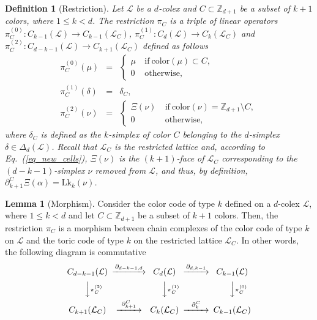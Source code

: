 \documentclass[onecolumn,letterpaper,11pt,accepted=2022-12-19]{quantumarticle}
\newcommand{\face}[2]{{\Delta_{#1}(#2)}}
\newcommand{\link}[2]{{\mathrm{Lk}_{#1}(#2)}}
\newcommand{\bnd}[2]{\partial_{#1,#2}}
\newcommand{\col}[1]{{\mathrm{color}(#1)}}
\newtheorem{definition}{Definition}
\theoremstyle{definition}
\newtheorem{lemma}{Lemma}
\theoremstyle{lemma}
\theoremstyle{theorem}
\theoremstyle{corollary}
\begin{document}
{\begin{definition}[Restriction]
Let $\mathcal{L}$ be a $d$-colex and $C\subset \mathbb{Z}_{d+1}$ be a subset of $k+1$ colors, where $1\leq k < d$.
The restriction $\pi_C$ is a triple of linear operators
$\pi^{(0)}_C : C_{k-1}({\mathcal L}) \rightarrow C_{k-1}({\mathcal L}_C)$,
${\pi^{(1)}_C : C_{d}({\mathcal L})\rightarrow C_{k}({\mathcal L}_C)}$ and
$\pi^{(2)}_C : C_{d-k-1}({\mathcal L}) \rightarrow C_{k+1}({\mathcal L}_C)$
defined as follows
\begin{eqnarray}
\pi^{(0)}_C(\mu) &=& 
\begin{cases}
\mu &\mathrm{\ if \ } \col{\mu} \subset C, \\
0 &\mathrm{\ otherwise},
\end{cases}\\
\pi^{(1)}_C(\delta) &=&  \delta_C,\\
\pi^{(2)}_C(\nu) &=& 
\begin{cases}
\Xi(\nu) &\mathrm{\ if \ } \col{\nu}= \mathbb{Z}_{d+1}\setminus C,\\
0 &\mathrm{\ otherwise},
\end{cases}
\end{eqnarray}
where $\delta_C$ is defined as the $k$-simplex of color $C$ belonging to the $d$-simplex $\delta\in\face{d}{\mathcal{L}}$.
Recall that $\mathcal{L}_C$ is the restricted lattice and, according to Eq.~(\ref{eq_new_cells}), $\Xi(\nu)$ is the $(k+1)$-face of ${\mathcal L}_C$ corresponding to the $(d-k-1)$-simplex $\nu$ removed from $\mathcal{L}$, and thus, by definition, $\partial_{k+1}^C \Xi(\alpha) = \link k \nu$.
\end{definition}



\begin{lemma}[Morphism]
\label{lemma_morphism}
Consider the color code of type $k$ defined on a $d$-colex $\mathcal{L}$, where $1\leq k < d$ and let $C \subset \mathbb{Z}_{d+1}$ be a subset of $k+1$ colors.
Then, the restriction $\pi_C$ is a morphism between chain complexes of the color code of type $k$ on $\mathcal{L}$ and the toric code of type $k$ on the restricted lattice $\mathcal{L}_C$.
In other words, the following diagram is commutative
\begin{equation}
\begin{CD}
C_{d-k-1}({\mathcal L}) @> \bnd{d-k-1}{d} >>
C_{d}({\mathcal L}) @> \bnd{d}{k-1} >>
C_{k-1}({\mathcal L})\\
@VV \pi^{(2)}_C V @VV \pi^{(1)}_C V @VV \pi^{(0)}_C V\\
C_{k+1}({\mathcal L}_C) @> \partial_{k+1}^C >> 
C_{k}({\mathcal L}_C) @> \partial_{k}^C >>
C_{k-1}({\mathcal L}_C)\\
\end{CD}
\label{eq_diagram}
\end{equation}
\end{lemma}

}
\end{document}
